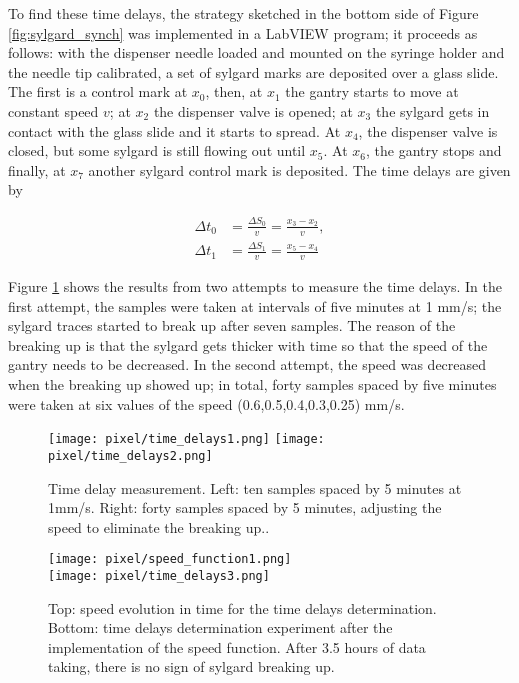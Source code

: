 To find these time delays, the strategy sketched in the bottom side of Figure \ref{fig:sylgard_synch} was implemented in a LabVIEW program; it proceeds as follows: with the dispenser needle loaded and mounted on the syringe holder and the needle tip calibrated, a set of sylgard marks are deposited over a glass slide. The first is a control mark at $x_0$, then, at $x_1$ the gantry starts to move at constant speed $v$; at $x_2$ the dispenser valve is opened; at $x_3$ the sylgard gets in contact with the glass slide and it starts to spread. At $x_4$, the dispenser valve is closed, but some sylgard is still flowing out until $x_5$. At $x_6$, the gantry stops and finally, at $x_7$ another sylgard control mark is deposited. The time delays are given by 

\begin{align}
  \Delta t_0&=\frac{\Delta S_0}{v}=\frac{x_3-x_2}{v},\\
  \Delta t_1&=\frac{\Delta S_1}{v}=\frac{x_5-x_4}{v}
\end{align}

Figure \ref{fig:delays_measure} shows the results from two attempts to measure the time delays. In the first attempt, the samples were taken at intervals of five minutes at 1 mm/s; the sylgard traces started to break up after seven samples. The reason of the breaking up is that the sylgard gets thicker with time so that the speed of the gantry needs to be decreased. In the second attempt, the speed was decreased when the breaking up showed up; in total, forty samples spaced by five minutes were taken at six values of the speed (0.6,0.5,0.4,0.3,0.25) mm/s.

\begin{figure}[h]
  \begin{center}
    \texttt{[image: pixel/time\_delays1.png]} 
    \texttt{[image: pixel/time\_delays2.png]}
    \caption[Time delay measurements.]{Time delay measurement. Left: ten samples spaced by 5 minutes at 1mm/s. Right: forty samples spaced by 5 minutes, adjusting the speed to eliminate the breaking up..}\label{fig:delays_measure}
  \end{center}
\end{figure}

\begin{figure}[h]
  \begin{center}
    \texttt{[image: pixel/speed\_function1.png]}\\ 
    \texttt{[image: pixel/time\_delays3.png]}
    \caption[Speed function for sylgard deposition.]{Top: speed evolution in time for the time delays determination. Bottom: time delays determination experiment after the implementation of the speed function. After 3.5 hours of data taking, there is no sign of sylgard breaking up.}\label{fig:speed_function}
  \end{center}
\end{figure}

